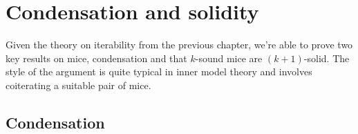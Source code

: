 \chapter{Condensation and solidity}
\thispagestyle{fancy}
\label{ch5}

Given the theory on iterability from the previous chapter, we're able to prove two key results on mice, condensation and that $k$-sound mice are $(k+1)$-solid. The style of the argument is quite typical in inner model theory and involves coiterating a suitable pair of mice.

\section{Condensation}

